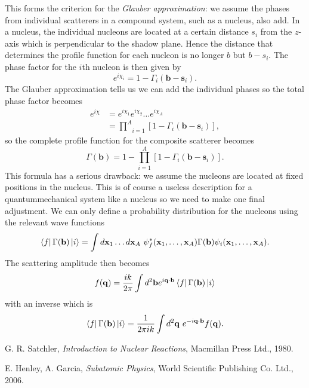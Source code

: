 \documentclass[11pt]{article}
\numberwithin{equation}{section}
\begin{document}
This forms the criterion for the \emph{Glauber approximation}: we assume the phases from individual scatterers in a compound system, such as a nucleus, also add. In a nucleus, the individual nucleons are located at a certain distance $s_i$ from the $z$-axis which is perpendicular to the shadow plane. Hence the distance that determines the profile function for each nucleon is no longer $b$ but $b-s_i$. The phase factor for the $i$th nucleon is then given by
\begin{equation}
	e^{i\chi_i} = 1 - \Gamma_i(\mathbf{b}-\mathbf{s}_i).
\end{equation}
The Glauber approximation tells us we can add the individual phases so the total phase factor becomes
\begin{align}
	e^{i\chi} &= e^{i\chi_1}e^{i\chi_2}\ldots e^{i\chi_A}\\
	& = \underset{i=1}{\overset{A}\prod}[1-\Gamma_i(\mathbf{b}-\mathbf{s}_i)],
\end{align}
so the complete profile function for the composite scatterer becomes
\begin{equation}
	\Gamma(\mathbf{b}) = 1 - \underset{i=1}{\overset{A}\prod}[1-\Gamma_i(\mathbf{b}-\mathbf{s}_i)].
\end{equation}
This formula has a serious drawback: we assume the nucleons are located at fixed positions in the nucleus. This is of course a useless description for a quantummechanical system like a nucleus so we need to make one final adjustment. We can only define a probability distribution for the nucleons using the relevant wave functions
\begin{equation}
	\bra{f}\Gamma(\mathbf{b})\ket{i} = \int d\mathbf{x}_1\ldots d\mathbf{x}_A ~\psi^{\ast}_f(\mathbf{x}_1, \ldots ,\mathbf{x}_A)\Gamma(\mathbf{b}) \psi_i(\mathbf{x}_1, \ldots ,\mathbf{x}_A).
\end{equation}
The scattering amplitude then becomes
\begin{equation}
	f(\mathbf{q}) = \frac{ik}{2\pi} \int d^2\mathbf{b} e^{i\mathbf{q} \cdot \mathbf{b}} \bra{f}\Gamma(\mathbf{b})\ket{i}
\end{equation}
with an inverse which is
\begin{equation}
	\bra{f}\Gamma(\mathbf{b})\ket{i} = \frac{1}{2\pi ik} \int d^2 \mathbf{q}~ e^{-i\mathbf{q}\cdot \mathbf{b}} f(\mathbf{q}).
\end{equation}
\begin{thebibliography}{10}
G. R. Satchler,
\emph{Introduction to Nuclear Reactions},
Macmillan Press Ltd.,
1980.

E. Henley, A. Garcia,
\emph{Subatomic Physics},
World Scientific Publishing Co. Ltd.,
2006.
	
\end{thebibliography}
\end{document}
